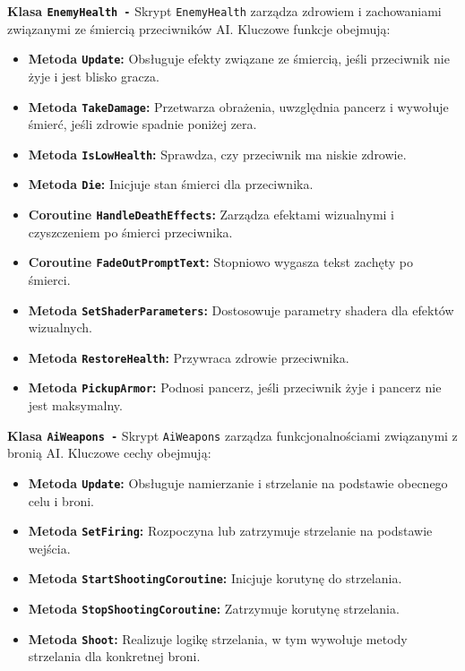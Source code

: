\textbf{Klasa \texttt{EnemyHealth -}}
Skrypt \texttt{EnemyHealth} zarządza zdrowiem i zachowaniami związanymi ze śmiercią przeciwników AI. Kluczowe funkcje obejmują:
\begin{itemize}
\item \textbf{Metoda \texttt{Update}:} Obsługuje efekty związane ze śmiercią, jeśli przeciwnik nie żyje i jest blisko gracza.
\item \textbf{Metoda \texttt{TakeDamage}:} Przetwarza obrażenia, uwzględnia pancerz i wywołuje śmierć, jeśli zdrowie spadnie poniżej zera.
\item \textbf{Metoda \texttt{IsLowHealth}:} Sprawdza, czy przeciwnik ma niskie zdrowie.
\item \textbf{Metoda \texttt{Die}:} Inicjuje stan śmierci dla przeciwnika.
\item \textbf{Coroutine \texttt{HandleDeathEffects}:} Zarządza efektami wizualnymi i czyszczeniem po śmierci przeciwnika.
\item \textbf{Coroutine \texttt{FadeOutPromptText}:} Stopniowo wygasza tekst zachęty po śmierci.
\item \textbf{Metoda \texttt{SetShaderParameters}:} Dostosowuje parametry shadera dla efektów wizualnych.
\item \textbf{Metoda \texttt{RestoreHealth}:} Przywraca zdrowie przeciwnika.
\item \textbf{Metoda \texttt{PickupArmor}:} Podnosi pancerz, jeśli przeciwnik żyje i pancerz nie jest maksymalny.
\end{itemize}

\textbf{Klasa \texttt{AiWeapons -}}
Skrypt \texttt{AiWeapons} zarządza funkcjonalnościami związanymi z bronią AI. Kluczowe cechy obejmują:
\begin{itemize}
\item \textbf{Metoda \texttt{Update}:} Obsługuje namierzanie i strzelanie na podstawie obecnego celu i broni.
\item \textbf{Metoda \texttt{SetFiring}:} Rozpoczyna lub zatrzymuje strzelanie na podstawie wejścia.
\item \textbf{Metoda \texttt{StartShootingCoroutine}:} Inicjuje korutynę do strzelania.
\item \textbf{Metoda \texttt{StopShootingCoroutine}:} Zatrzymuje korutynę strzelania.
\item \textbf{Metoda \texttt{Shoot}:} Realizuje logikę strzelania, w tym wywołuje metody strzelania dla konkretnej broni.
\end{itemize}

